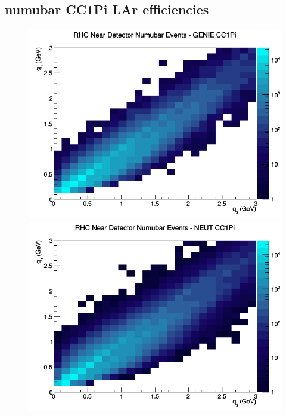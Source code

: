 \documentclass[12pt]{article}
\begin{document}
\subsection{numubar CC1Pi LAr efficiencies}
\begin{figure}[h]
\includegraphics[width=\linewidth]{eff_q0_q3/LAr/CC1Pi_RHC_ND_numubar_q3_q0_GENIE.png}
\endminipage
{}
\includegraphics[width=\linewidth]{eff_q0_q3/LAr/CC1Pi_RHC_ND_numubar_q3_q0_NEUT.png}
\endminipage
{}

\end{figure}
\end{document}
